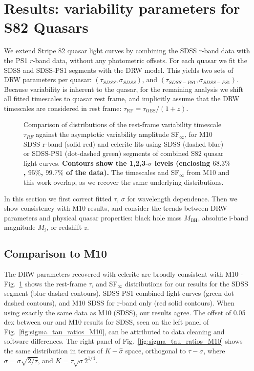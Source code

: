 \documentclass[twocolumn]{aastex62}
\newcommand{\project}[1]{\textsf{#1}}
\begin{document}
%
%
%
%
%
%

\section{Results: variability parameters for S82 Quasars}\label{sec:results}

We extend Stripe 82 quasar light curves by combining the SDSS r-band data with  the PS1 $r$-band data, without any photometric offsets. For each quasar we fit the SDSS and SDSS-PS1 segments  with the DRW model. This yields two sets of DRW parameters per quasar: $(\tau_{SDSS}, \sigma_{SDSS})$, and $(\tau_{SDSS-PS1},\sigma_{SDSS-PS1})$. Because variability is inherent to the quasar, for the remaining analysis we shift all fitted timescales to quasar rest frame, and implicitly assume that the DRW timescales are considered in rest frame: $\tau_{\mathrm{RF}} = \tau_{\mathrm{OBS}} / (1+z)$.

\begin{figure} 
	\caption{Comparison of distributions of the rest-frame variability timescale $\tau_{RF}$ against the  asymptotic variability amplitude SF$_{\infty}$, for M10 SDSS r-band (solid red)  and \project{celerite} fits using  SDSS (dashed blue) or SDSS-PS1 (dot-dashed green) segments of combined S82 quasar light curves. \textbf{Contours show the 1,2,3-$\sigma$ levels (enclosing $68.3\%$, $95\%$, $99.7\%$ of the data).} The timescales and SF$_{\infty}$ from M10 and this work overlap, as we recover the same underlying distributions. }
	\label{fig:tau_sf_dist}
\end{figure} 


In this section we first correct fitted $\tau$, $\sigma$ for wavelength dependence. Then we show consistency with M10 results,  and consider the trends between DRW parameters and physical quasar properties: black hole mass $M_{\mathrm{BH}}$, absolute i-band  magnitude $M_{i}$, or redshift $z$.  


\subsection{Comparison to M10}
The DRW parameters recovered with \project{celerite} are  broadly consistent with M10 - Fig.~\ref{fig:tau_sf_dist} shows the rest-frame  $\tau$, and SF$_{\infty}$ distributions for our results for the SDSS segment (blue dashed contours),  SDSS-PS1 combined light curves (green dot-dashed contours), and  M10 SDSS for r-band only (red solid contours). When using exactly the same data as M10 (SDSS), our results agree. The offset of 0.05 dex  between our and M10 results for SDSS, seen on the left panel of Fig.~\ref{fig:sigma_tau_ratios_M10}, can be attributed to data cleaning and software differences. The right panel of Fig.~\ref{fig:sigma_tau_ratios_M10} shows the same distribution in terms of $K-\hat{\sigma}$ space, orthogonal to $\tau-\sigma$, where $\hat{\sigma} = \sigma\sqrt{2 / \tau}$, and $K = \tau \sqrt{\sigma} 2^{1/4} $. 
\end{document}
